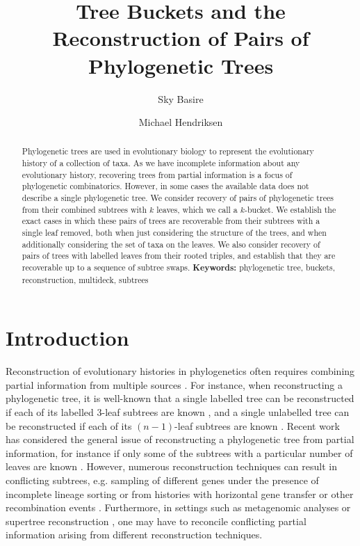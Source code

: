 \documentclass[12pt]{article}
\title{Tree Buckets and the Reconstruction of Pairs of Phylogenetic Trees}
\author[1]{Sky Basire}
\author[1, *]{Michael Hendriksen}
\affil[1]{Department of Mathematics and Statistics, University of New South Wales}
\affil[*]{Corresponding author: Michael Hendriksen, m.hendriksen@unsw.edu.au}
\theoremstyle{definition}
\begin{document}
\maketitle

\begin{abstract}
Phylogenetic trees are used in evolutionary biology to represent the evolutionary history of a collection of taxa. As we have incomplete information about any evolutionary history, recovering trees from partial information is a focus of phylogenetic combinatorics. However, in some cases the available data does not describe a single phylogenetic tree. We consider recovery of pairs of phylogenetic trees from their combined subtrees with $k$ leaves, which we call a $k$-bucket. We establish the exact cases in which these pairs of trees are recoverable from their subtrees with a single leaf removed, both when just considering the structure of the trees, and when additionally considering the set of taxa on the leaves. We also consider recovery of pairs of trees with labelled leaves from their rooted triples, and establish that they are recoverable up to a sequence of subtree swaps.
 \smallskip \newline
\noindent \textbf{Keywords:} 
phylogenetic tree, buckets, reconstruction, multideck, subtrees

\end{abstract}

\section{Introduction}

Reconstruction of evolutionary histories in phylogenetics often requires combining partial information from multiple sources \cite{kapli2020phylogenetic} \cite{delsuc2005phylogenomics}. For instance, when reconstructing a phylogenetic tree, it is well-known that a single labelled tree can be reconstructed if each of its labelled $3$-leaf subtrees are known \cite{aho1981inferring}, and a single unlabelled tree can be reconstructed if each of its $(n-1)$-leaf subtrees are known \cite{Decks_of_rooted_binary_trees}. Recent work has considered the general issue of reconstructing a phylogenetic tree from partial information, for instance if only some of the subtrees with a particular number of leaves are known \cite{Decks_of_rooted_binary_trees}. However, numerous reconstruction techniques can result in conflicting subtrees, e.g. sampling of different genes under the presence of incomplete lineage sorting or from histories with horizontal gene transfer or other recombination events \cite{felsenstein2003inferring}. Furthermore, in settings such as metagenomic analyses \cite{delsuc2005phylogenomics} or supertree reconstruction \cite{bininda2002super}, one may have to reconcile conflicting partial information arising from different reconstruction techniques.
\end{document}

